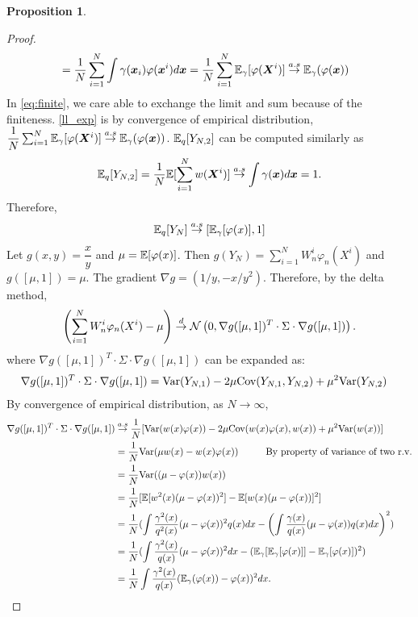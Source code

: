 \documentclass[10pt]{article}
\theoremstyle{definition}
\newtheorem{proposition}{Proposition}
\numberwithin{equation}{section}
\begin{document}
\begin{proposition}
\begin{proof}
\begin{align}
			&= \dfrac{1}{N} \sum_{i=1}^{N} \int \gamma(\bm{x}_i) \varphi(\bm{x}^i) d\bm{x} =  \dfrac{1}{N} 
			\sum_{i=1}^{N}\mathbb{E}_\gamma[\varphi(\bm{\bm{X}}^i)] \overset{a.s}{\to} \mathbb{E}_\gamma(\varphi(\bm{x})) \label{ll_exp} 
		\end{align}
		In \eqref{eq:finite}, we care able to exchange the limit and sum because of the finiteness. \eqref{ll_exp} is by convergence of empirical distribution, $\dfrac{1}{N} 
		\sum_{i=1}^{N}\mathbb{E}_\gamma[\varphi(\bm{X}^i)] \overset{a.s}\to \mathbb{E}_\gamma(\varphi(\bm{x})) $. $\mathbb{E}_q[Y_{N,2}]$ can be computed similarly as
		\begin{equation}
			\mathbb{E}_q[Y_{N,2}] = \dfrac{1}{N}\mathbb{E}[\sum_{i=1}^{N} w(\bm{X}^i)] \overset{a.s}{\to} \int \gamma(\bm{x}) d\bm{x} = 1.
		\end{equation}
		Therefore, 
		\begin{equation}
			\mathbb{E}_q[Y_N] \overset{a.s}{\to} \left[ \mathbb{E}_\gamma[\varphi(x)], 1\right]
		\end{equation}
		Let $g(x,y) = \dfrac{x}{y}$ and $\mu = \mathbb{E}[\varphi(x)]$. Then $g(Y_N) = \sum_{i=1}^{N} W_n^i \varphi_n(X^i)$ and $g([\mu, 1]) = \mu$. The gradient $\nabla g = \left( 1/y, -x/y^2 \right).$ Therefore, by the delta method,
		\begin{equation}
			\left(  \sum_{i=1}^{N} W_n^i \varphi_n(X^i) - \mu \right) \overset{d}{\to} \mathcal{N} \left( 0,\nabla g([\mu, 1])^T \cdot \Sigma \cdot \nabla g([\mu, 1]) \right).
		\end{equation}
		where $\nabla g([\mu, 1])^T \cdot \Sigma \cdot \nabla g([\mu, 1])$ can be expanded as:
		\begin{align}
		\nabla g([\mu, 1])^T \cdot \Sigma \cdot \nabla g([\mu, 1]) &= \text{Var}(Y_{N,1}) - 2\mu\text{Cov}(Y_{N,1},Y_{N,2}) + \mu^2\text{Var}(Y_{N,2})
		\end{align} By convergence of empirical distribution, as $N \to \infty$,
		\begin{align}
		\nabla g([\mu, 1])^T \cdot \Sigma \cdot \nabla g([\mu, 1]) &\overset{a.s}{\to}  \frac{1}{N}[\text{Var}(w(x)\varphi(x)) - 2\mu\text{Cov}(w(x)\varphi(x),w(x)) + \mu^2\text{Var}(w(x))] \\
		&=\frac{1}{N} \text{Var}(\mu w(x) - w(x)\varphi(x)) \hspace{1cm} \text{By property of variance of two r.v.}\\
		&= \frac{1}{N} \text{Var}((\mu - \varphi(x))w(x)) \\
		&= \frac{1}{N} [\mathbb{E}[w^2(x)(\mu - \varphi(x))^2] - \mathbb{E}[w(x)(\mu - \varphi(x))]^2] \\
		&= \frac{1}{N}(\int \dfrac{\gamma^2(x)}{q^2(x)}(\mu - \varphi(x))^2 q(x)dx - \left(\int \dfrac{\gamma(x)}{q(x)} (\mu - \varphi(x) ) q(x)dx\right)^2) \\
		&= \frac{1}{N}(\int \dfrac{\gamma^2(x)}{q(x)}(\mu - \varphi(x))^2dx - (\mathbb{E}_\gamma[\mathbb{E}_\gamma[\varphi(x)]] - \mathbb{E}_\gamma[\varphi(x)])^2) \\ &= \frac{1}{N} \int \dfrac{\gamma^2(x)}{q(x)}(\mathbb{E}_\gamma(\varphi(x)) - \varphi(x))^2dx.
		\end{align}
	

\end{proof}
\end{proposition}
\end{document}
